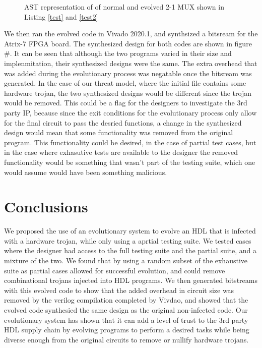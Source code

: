 \documentclass[conference]{IEEEtran}
\begin{document}
{\begin{figure}[htb]
    \centering
    \caption{AST representation of of normal and evolved 2-1 MUX shown in Listing \ref{test} and \ref{test2}}
    \label{fig:2-1_mux}
\end{figure}

\par We then ran the evolved code in Vivado 2020.1, and synthsized a bitsream for the Atrix-7 FPGA board.
The synthesized design for both codes are shown in figure #.
It can be seen that although the two programs varied in their size and implenmitation, their synthesized designs were the same.
The extra overhead that was added during the evolutionary process was negatable once the bitsream was generated. 
In the case of our threat model, where the initial file contains some hardware trojan, the two synthesized designs would be different since the trojan would be removed.
This could be a flag for the designers to investigate the 3rd party IP, because since the exit conditions for the evolutionary process only allow for the final circuit to pass the desried functions, a change in the synthesized design would mean that some functionality was removed from the original program.
This functionality could be desired, in the case of partial test cases, but in the case where exhasutive tests are available to the designer the removed functionality would be something that wasn't part of the testing suite, which one would assume would have been something malicious.


\section{Conclusions}
\par We proposed the use of an evolutionary system to evolve an HDL that is infected with a hardware trojan, while only using a aprtial testing suite. 
We tested cases where the designer had access to the full testing suite and the partial suite, and a mixture of the two.
We found that by using a random subset of the exhaustive suite as partial cases allowed for successful evolution, and could remove combinational trojans injected into HDL programs.
We then generated bitstreams with this evolved code to show that the added overhead in circuit size was removed by the verilog compilation completed by Vivdao, and showed that the evolved code synthesied the same design as the original non-infected code.
Our evolutionary system has shown that it can add a level of trust to the 3rd party HDL supply chain by evolving programs to perform a desired tasks while being diverse enough from the original circuits to remove or nullify hardware trojans.

}
\end{document}

